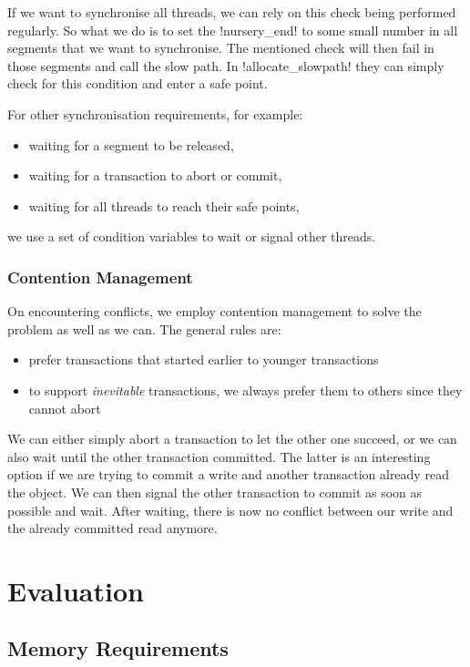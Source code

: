 \documentclass{sigplanconf}
\makeatletter
\renewcommand\lstinline[1][]{%
  \Collectverb{\@@myverb}%
}
\def\@@myverb#1{%
    \begingroup
    \fboxsep=0.2em
    \colorbox{verylightgray}{\oldlstinline|#1|}%
    \endgroup
}
\makeatother
\begin{document}
If we want to synchronise all threads, we can rely on this check being
performed regularly. So what we do is to set the
\lstinline!nursery_end!  to some small number in all segments that we
want to synchronise. The mentioned check will then fail in those
segments and call the slow path. In \lstinline!allocate_slowpath!
they can simply check for this condition and enter a safe point.

For other synchronisation requirements, for example:
\begin{itemize}[noitemsep]
\item waiting for a segment to be released,
\item waiting for a transaction to abort or commit,
\item waiting for all threads to reach their safe points,
\end{itemize}
we use a set of condition variables to wait or signal other threads.


\subsubsection{Contention Management\label{subsub:contentionmanagement}}

On encountering conflicts, we employ contention management to solve
the problem as well as we can. The general rules are:
\begin{itemize}[noitemsep]
\item prefer transactions that started earlier to younger transactions
\item to support \emph{inevitable} transactions, we always prefer them
  to others since they cannot abort
\end{itemize}
We can either simply abort a transaction to let the other one succeed,
or we can also wait until the other transaction committed. The latter
is an interesting option if we are trying to commit a write and
another transaction already read the object. We can then signal the
other transaction to commit as soon as possible and wait. After
waiting, there is now no conflict between our write and the already
committed read anymore.



\section{Evaluation}

\subsection{Memory Requirements}
\end{document}
